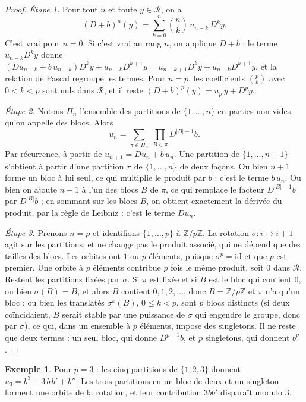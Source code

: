 \documentclass[11pt,a4paper]{article}
\theoremstyle{plain}
\theoremstyle{definition}
\newtheorem{exemple}[theoreme]{Exemple}
\theoremstyle{remark}
\newcommand{\Z}{\mathbb{Z}}
\newcommand{\Dx}{D}
\begin{document}
\begin{proof}
\emph{Étape 1.} Pour tout $n$ et toute $y \in \mathcal R$, on a
\[
  (\Dx+b)^n (y) = \sum_{k=0}^n \binom nk\, u_{n-k}\, \Dx^k y .
\]
C'est vrai pour $n = 0$. Si c'est vrai au rang $n$, on applique $\Dx + b$ : le terme $u_{n-k}\Dx^k y$ donne $(\Dx u_{n-k} + b\,u_{n-k})\Dx^k y + u_{n-k}\Dx^{k+1}y = u_{n-k+1}\Dx^k y + u_{n-k}\Dx^{k+1} y$, et la relation de Pascal regroupe les termes. Pour $n = p$, les coefficients $\binom pk$ avec $0<k<p$ sont nuls dans $\mathcal R$, et il reste $(\Dx+b)^p(y) = u_p\,y + \Dx^p y$.

\emph{Étape 2.} Notons $\Pi_n$ l'ensemble des partitions de $\{1, \dots, n\}$ en parties non vides, qu'on appelle des blocs. Alors
\[
  u_n = \sum_{\pi \in \Pi_n}\ \prod_{B \in \pi} \Dx^{|B|-1} b .
\]
Par récurrence, à partir de $u_{n+1} = \Dx u_n + b\, u_n$. Une partition de $\{1, \dots, n+1\}$ s'obtient à partir d'une partition $\pi$ de $\{1, \dots, n\}$ de deux façons. Ou bien $n+1$ forme un bloc à lui seul, ce qui multiplie le produit par $b$ : c'est le terme $b\,u_n$. Ou bien on ajoute $n+1$ à l'un des blocs $B$ de $\pi$, ce qui remplace le facteur $\Dx^{|B|-1}b$ par $\Dx^{|B|}b$ ; en sommant sur les blocs $B$, on obtient exactement la dérivée du produit, par la règle de Leibniz : c'est le terme $\Dx u_n$.

\emph{Étape 3.} Prenons $n = p$ et identifions $\{1, \dots, p\}$ à $\Z/p\Z$. La rotation $\sigma : i \mapsto i+1$ agit sur les partitions, et ne change pas le produit associé, qui ne dépend que des tailles des blocs. Les orbites ont $1$ ou $p$ éléments, puisque $\sigma^p = \mathrm{id}$ et que $p$ est premier. Une orbite à $p$ éléments contribue $p$ fois le même produit, soit $0$ dans $\mathcal R$. Restent les partitions fixées par $\sigma$. Si $\pi$ est fixée et si $B$ est le bloc qui contient $0$, ou bien $\sigma(B) = B$, et alors $B$ contient $0, 1, 2, \dots$, donc $B = \Z/p\Z$ et $\pi$ n'a qu'un bloc ; ou bien les translatés $\sigma^k(B)$, $0 \leq k < p$, sont $p$ blocs distincts (si deux coïncidaient, $B$ serait stable par une puissance de $\sigma$ qui engendre le groupe, donc par $\sigma$), ce qui, dans un ensemble à $p$ éléments, impose des singletons. Il ne reste que deux termes : un seul bloc, qui donne $\Dx^{p-1}b$, et $p$ singletons, qui donnent $b^p$.
\end{proof}

\begin{exemple}
Pour $p = 3$ : les cinq partitions de $\{1,2,3\}$ donnent $u_3 = b^3 + 3\,b\,b' + b''$. Les trois partitions en un bloc de deux et un singleton forment une orbite de la rotation, et leur contribution $3bb'$ disparaît modulo $3$.
\end{exemple}
\end{document}
